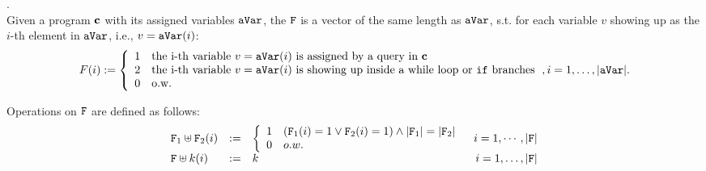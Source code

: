 \documentclass[a4paper,11pt]{article}
\begin{document}
\begin{defn}.
\\
Given a program  $\boldsymbol{\mathbf{c}}$ with its assigned variables $\mathtt{aVar}$, the $\mathtt{F}$ is a vector of the same length as $\mathtt{aVar}$, s.t. for each variable $v$ showing up as the $i$-th element in $\mathtt{aVar}$, i.e., $v = \mathtt{aVar}(i)$:
%
%
\[
	F(i) := 
	\left\{
	\begin{array}{ll}
	1 & \text{the i-th variable $v = \avar(i)$ is assigned by a query in $\ssa{c}$}
	\\
	2 & \text{the i-th variable $v = \avar(i)$ is showing up inside a while loop or $\eif$ branches} 
	\\
	0 & \text{o.w.}
	\end{array}
	\right., 
	i = 1, \ldots, |\avar|.
\] 
\end{defn}
%
Operations on $\mathtt{F}$ are defined as follows:
\begin{equation}
\begin{array}{lllr}
{\flag_1 \uplus \flag_2}(i) & := &
\left\{
\begin{array}{ll}
1 & (\flag_1(i) = 1 \lor \flag_2(i) = 1) \land |\flag_1| = |\flag_2|\\
0 & o.w.
\end{array}\right.
& i = 1, \cdots, |\flag|  
\\
{\flag \uplus k}(i) & := & k 
& i = 1, \ldots, |\flag|    \\
\end{array}
\end{equation}
\end{document}
